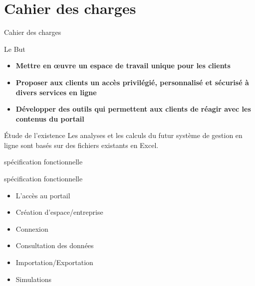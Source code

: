 \documentclass[french]{beamer}
\begin{document}
\section{Cahier des charges}
\begin{frame}{Cahier des charges}
	
  \begin{block}{Le But}
  \begin{itemize}
\item \textbf{  Mettre en œuvre un espace de travail unique pour les clients}

\item \textbf{ Proposer aux clients un accès privilégié, personnalisé et sécurisé  à divers services en
ligne}
 
\item \textbf{ Développer des outils qui permettent aux clients de réagir avec les contenus du
portail}


\end{itemize}

\end{block}  	
	
	\begin{block}{Étude de l’existence }
	Les analyses et les calculs du futur système de gestion en ligne sont basés
sur des fichiers existants en Excel.
	\end{block}
	
\end{frame}


\begin{frame}{spécification fonctionnelle}


	\begin{exampleblock}{spécification fonctionnelle}
	\begin{itemize}
	
	\item L'accès au portail
	\item Création d’espace/entreprise
	\item Connexion
	\item Consultation des données
	\item Importation/Exportation
	\item Simulations
	
	\end{itemize}

	 \end{exampleblock}
	
	
	
	
	
\end{frame}
\end{document}
